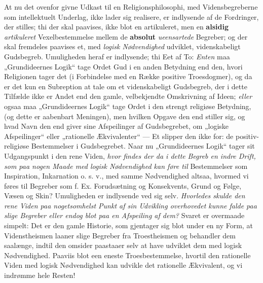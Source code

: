 \documentclass[12pt,a4paper]{book}
\newcommand{\opage}[1]{\marginnote{\footnotesize\textit{[#1]}}}
\begin{document}
At nu det ovenfor givne Udkast til en Religionsphilosophi,
med Vidensbegreberne som intellektuelt Underlag,
ikke lader sig realisere, er indlysende af de Fordringer,
der stilles; thi der skal paavises, ikke blot en
artikuleret, men en \textbf{alsidig} \emph{artikuleret} Vexelbestemmelse
mellem de \textbf{absolut} \emph{ueensartede} Begreber; og der skal
fremdeles paavises et, med \emph{logisk Nødvendighed}
udviklet, videnskabeligt Gudsbegreb. Umuligheden heraf
er indlysende; thi Eet af To: \emph{Enten} maa „Grundideernes
Logik“ tage Ordet Gud i en anden Betydning
end den, hvori Religionen tager det (i Forbindelse med
en Række positive Troesdogmer), og da er det kun en
Subreption at tale om et videnskabeligt Gudsbegreb,
der i dette Tilfælde ikke er Andet end den gamle, velbekjendte
Omskrivning af Ideen; \emph{eller} ogsaa maa „Grundideernes
Logik“ tage Ordet i den strengt religiøse Betydning, (og
dette er aabenbart Meningen), men hvilken Opgave den
end stiller sig, og hvad Navn den end giver sine
Afspeilinger af Gudsbegrebet, om „logiske Afspeilinger“
eller „rationelle Ækvivalenter“ --- Et slipper den ikke
for: de positiv-religiøse Bestemmelser i Gudsbegrebet.
Naar nu „Grundideernes Logik“ tager sit Udgangspunkt
i den rene Viden, \emph{hvor findes der da i dette}
\opage{73}\setcounter{footnote}{0}\emph{Begreb en indre Drift, som paa nogen Maade
med logisk Nødvendighed kan føre til} Bestemmelser
som Inspiration, Inkarnation o. s. v., med
samme Nødvendighed altsaa, hvormed vi føres til Begreber
som f. Ex. Forudsætning og Konsekvents, Grund
og Følge, Væsen og Skin? Umuligheden er indlysende
ved sig selv. \emph{Hvorledes skulde den rene Viden
paa nogetsomhelst Punkt af sin Udvikling
overhovedet kunne falde paa slige Begreber
eller endog blot paa en Afspeiling af dem?}
Svaret er overmaade simpelt: Det er den gamle Historie,
som gjentager sig blot under en ny Form, at
Videnstheismen laaner slige Begreber fra Troestheismen
og behandler dem saalænge, indtil den omsider paastaaer
selv at have udviklet dem med logisk Nødvendighed.
Paaviis blot een eneste Troesbestemmelse, hvortil den
rationelle Viden med logisk Nødvendighed kan udvikle det
rationelle Ækvivalent, og vi indrømme hele Resten!
\end{document}
